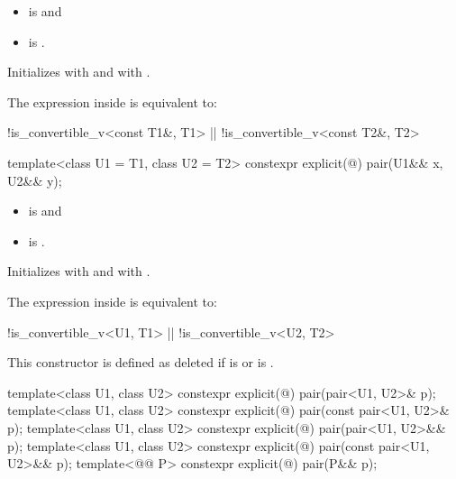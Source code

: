\begin{itemdescr}
\pnum
\constraints
\begin{itemize}
\item {} is  and
\item {} is .
\end{itemize}

\pnum
\effects
Initializes  with  and  with .

\pnum
\remarks
The expression inside  is equivalent to:
\begin{codeblock}
!is_convertible_v<const T1&, T1> || !is_convertible_v<const T2&, T2>
\end{codeblock}
\end{itemdescr}

%
\begin{itemdecl}
template<class U1 = T1, class U2 = T2> constexpr explicit(@\seebelow@) pair(U1&& x, U2&& y);
\end{itemdecl}

\begin{itemdescr}
\pnum
\constraints
\begin{itemize}
\item {} is  and
\item {} is .
\end{itemize}

\pnum
\effects
Initializes  with
 and 
with .

\pnum
\remarks
The expression inside  is equivalent to:
\begin{codeblock}
!is_convertible_v<U1, T1> || !is_convertible_v<U2, T2>
\end{codeblock}
This constructor is defined as deleted if
is  or
is .
\end{itemdescr}

%
\begin{itemdecl}
template<class U1, class U2> constexpr explicit(@\seebelow@) pair(pair<U1, U2>& p);
template<class U1, class U2> constexpr explicit(@\seebelow@) pair(const pair<U1, U2>& p);
template<class U1, class U2> constexpr explicit(@\seebelow@) pair(pair<U1, U2>&& p);
template<class U1, class U2> constexpr explicit(@\seebelow@) pair(const pair<U1, U2>&& p);
template<@@ P> constexpr explicit(@\seebelow@) pair(P&& p);
\end{itemdecl}

